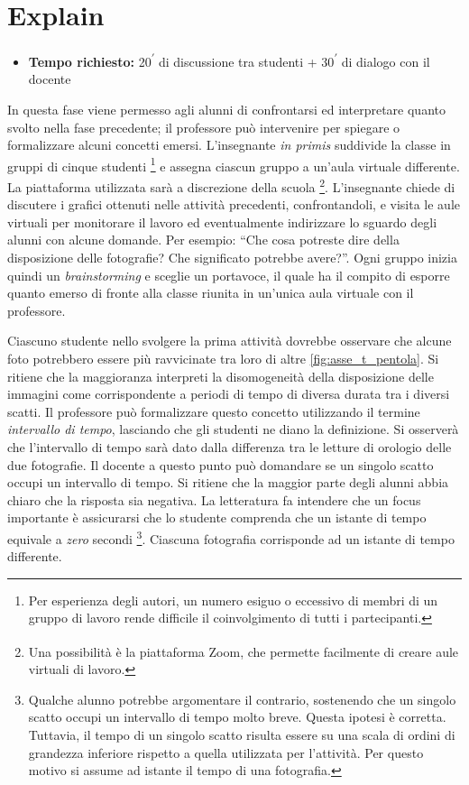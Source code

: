 \documentclass{report} \usepackage[T1]{fontenc} \usepackage[italian]{babel}
\begin{document}
\section{Explain}\label{posizioni_istanti_explain}
\begin{itemize}
\item \textbf{Tempo richiesto:} 20\textsuperscript{$\prime$} di discussione tra
studenti + 30\textsuperscript{$\prime$} di dialogo con il docente
\end{itemize}

In questa fase viene permesso agli alunni di confrontarsi ed interpretare
quanto svolto nella fase precedente; il professore può intervenire per spiegare
o formalizzare alcuni concetti emersi.
L’insegnante \emph{in primis} suddivide la classe in gruppi di cinque studenti
\footnote{
          Per  esperienza degli autori, un numero esiguo o eccessivo di membri
          di un gruppo di lavoro rende difficile il coinvolgimento di tutti i
          partecipanti.
         }
e assegna
ciascun gruppo a un’aula virtuale differente. La piattaforma utilizzata sarà a
discrezione della scuola
\footnote{
          Una possibilità è la piattaforma Zoom\textsuperscript{\textregistered},
          che  permette facilmente di creare aule virtuali di lavoro.
         }.
L’insegnante chiede di
discutere i grafici ottenuti nelle attività precedenti, confrontandoli, e
visita le aule virtuali per monitorare il lavoro ed eventualmente indirizzare
lo sguardo degli alunni con alcune domande. Per esempio: ``Che cosa potreste
dire della disposizione delle fotografie? Che significato potrebbe avere?''.
Ogni gruppo inizia quindi un \emph{brainstorming} e sceglie un portavoce,
il quale ha il  compito di esporre quanto emerso di fronte alla classe riunita
in un’unica aula virtuale con il professore.

Ciascuno studente nello svolgere la prima attività dovrebbe osservare che
alcune foto potrebbero essere più ravvicinate tra loro di altre
\ref{fig:asse_t_pentola}. Si ritiene che la maggioranza
interpreti la disomogeneità della disposizione delle
immagini come corrispondente a periodi di tempo di diversa durata tra i diversi
scatti. Il professore può formalizzare questo concetto utilizzando il termine
\emph{intervallo di tempo}, lasciando che gli studenti ne diano la definizione.
Si osserverà che l’intervallo di tempo sarà dato dalla differenza tra le
letture di orologio delle due fotografie. Il docente a questo punto può
domandare se un singolo scatto occupi un intervallo di tempo. Si ritiene che la
maggior parte degli alunni abbia chiaro che la risposta sia negativa. La letteratura
fa intendere che un focus importante è assicurarsi che lo studente comprenda
che un istante di tempo equivale a \emph{zero} secondi\cite{arons1997teaching}
\footnote{
          Qualche alunno potrebbe argomentare il contrario, sostenendo che un singolo scatto
          occupi un intervallo di tempo molto breve. Questa ipotesi è corretta. Tuttavia,
          il tempo di un singolo scatto risulta essere su una scala di ordini di
          grandezza inferiore rispetto a quella utilizzata per l’attività. Per questo
          motivo si assume ad istante il tempo di una fotografia.
         }.
Ciascuna fotografia corrisponde ad un istante di tempo differente.
\end{document}
